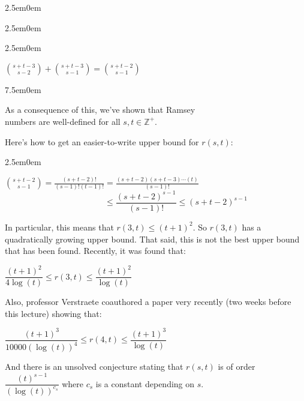 \documentclass{book}
\newcommand{\hThree}{%
   \color{PineGreen}
   \fontsize{13}{15}\selectfont%
}
\newcommand{\teachComment}{
   \color{Orange}%
   \fontsize{12}{14}\selectfont%
}
\newenvironment{myIndent}{%
   \begin{adjustwidth}{2.5em}{0em}%
}{%
   \end{adjustwidth}%
}
\newenvironment{myTindent}{%
   \begin{adjustwidth}{7.5em}{0em}%
}{%
   \end{adjustwidth}%
}
\newcommand{\retTwo}{\hfill\bigbreak}
\begin{document}
{\begin{myIndent}
{\begin{myIndent}
{\begin{myIndent}
         {\center ${\displaystyle \binom{s+t-3}{s-2}} + {\displaystyle \binom{s+t-3}{s-1}} = {\displaystyle \binom{s+t-2}{s-1}} $\retTwo\par}

         {\begin{myTindent} \teachComment
            As a consequence of this, we've shown that Ramsey\\ numbers are well-defined for all $s, t \in \mathbb{Z}^+$.
         \end{myTindent}}
      \end{myIndent}}
   \end{myIndent}}

   \newpage%

   Here's how to get an easier-to-write upper bound for $r(s, t)$:

   
   {\begin{myIndent} \hThree
      ${\displaystyle \binom{s+t-2}{s-1}} = {\displaystyle \frac{(s+t-2)!}{(s-1)!(t-1)!}} = {\displaystyle \frac{(s+t-2)(s+t-3)\cdots(t)}{(s-1)!}}$\\
      $\phantom{{\displaystyle \binom{s+t-2}{s-1}} = {\displaystyle \frac{(s+t-2)!}{(s-1)!(t-1)!}}} \leq \dfrac{(s+t-2)^{s-1}}{(s-1)!} \leq (s+t-2)^{s-1}$
      \retTwo
   \end{myIndent}}

   In particular, this means that $r(3, t) \leq  (t+1)^2$. So $r(3, t)$ has a quadratically growing upper bound. That said, this is not the best upper bound that has been found. Recently, it was found that:

   {\center $\dfrac{(t+1)^2}{4\log(t)} \leq r(3, t) \leq \dfrac{(t+1)^2}{\log(t)}$ \retTwo\par}

   Also, professor Verstraete coauthored a paper very recently (two weeks before this lecture) showing that:

   {\center $\dfrac{(t+1)^3}{10000(\log(t))^4} \leq r(4, t) \leq \dfrac{(t+1)^3}{\log(t)}$ \retTwo\par}

   And there is an unsolved conjecture stating that $r(s, t)$ is of order $\dfrac{(t)^{s-1}}{(\log(t))^{c_s}}$ where $c_s$ is a constant depending on $s$.


\end{myIndent}}
\end{document}

